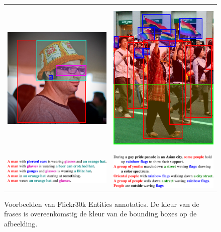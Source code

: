 \begin{figure}[!tb]
    \centering
    \begin{tabular}[t]{cc}
      \includegraphics[height=3.0in]{Images/example_hat.png} \vspace{-3mm}&
      \includegraphics[height=3.0in]{Images/example_parade.png}\\
      \includegraphics[valign = T,width=.4\columnwidth]{Images/example_hat_text.pdf}&
      \includegraphics[valign = T,width=.4\columnwidth]{Images/example_parade_text.pdf}
  \end{tabular}
\caption{Voorbeelden van Flickr30k Entities annotaties. De kleur van de frases is overeenkomstig de kleur van de bounding boxes op de afbeelding.}
\label{fig:entities}
\end{figure}

